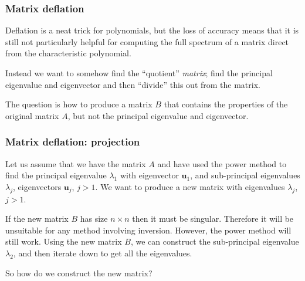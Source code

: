 \documentclass{beamer}
\newcommand{\bfm}[1]{{\boldsymbol{#1}}}
\begin{document}
\begin{frame}
  \frametitle{Matrix deflation}

  Deflation is a neat trick for polynomials, but the loss of accuracy
  means that it is still not particularly helpful for computing the
  full spectrum of a matrix direct from the characteristic
  polynomial. \pause

  \vspace{1ex}

  Instead we want to somehow find the ``quotient'' \emph{matrix}; find
  the principal eigenvalue and eigenvector and then ``divide'' this
  out from the matrix. \pause

  \vspace{1ex}

  The question is how to produce a matrix $B$ that contains the
  properties of the original matrix $A$, but not the principal
  eigenvalue and eigenvector.

\end{frame}

\begin{frame}
  \frametitle{Matrix deflation: projection}

  Let us assume that we have the matrix $A$ and have used the power
  method to find the principal eigenvalue $\lambda_1$ with eigenvector
  $\bfm{u}_1$, and sub-principal eigenvalues $\lambda_j$,
  eigenvectors $\bfm{u}_j$, $j>1$. \pause We want to produce a new
  matrix with eigenvalues $\lambda_j$, $j>1$. \pause

  \vspace{1ex}

  If the new matrix $B$ has size $n \times n$ then it must be
  singular. Therefore it will be unsuitable for any method involving
  inversion. However, the power method will still work. Using the new
  matrix $B$, we can construct the sub-principal eigenvalue
  $\lambda_2$, and then iterate down to get all the eigenvalues.
  \pause

  \vspace{1ex}

  So how do we construct the new matrix?

\end{frame}
\end{document}

